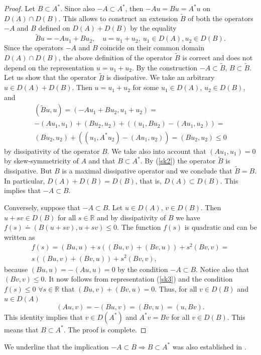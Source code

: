 \documentclass[12pt]{article}
\newcommand{\R}{{\mathbb R}}
\numberwithin{equation}{section}
\theoremstyle{plain}
\theoremstyle{definition}
\begin{document}
\begin{proof}
Let $B\subset A^*$. Since also $-A\subset A^*$, then $-Au=Bu=A^*u$ on $D(A)\cap D(B)$. This allows to construct an extension  $\tilde B$
of both the operators $-A$ and $B$ defined on $D(A)+D(B)$ by the equality
\[
\tilde Bu=-Au_1+Bu_2, \quad u=u_1+u_2, \ u_1\in D(A), u_2\in D(B).
\]
Since the operators $-A$ and $B$ coincide on their common domain $D(A)\cap D(B)$, the above definition of the operator $\tilde B$ is correct and does not depend on the representation $u=u_1+u_2$. By the construction $-A\subset \tilde B$, $B\subset \tilde B$. Let us show that the operator $\tilde B$ is dissipative. We take an arbitrary $u\in D(A)+D(B)$. Then $u=u_1+u_2$ for some $u_1\in D(A)$, $u_2\in D(B)$, and
\begin{align}\label{sk2}
(\tilde Bu,u)=(-Au_1+Bu_2,u_1+u_2)=\nonumber\\-(Au_1,u_1)+(Bu_2,u_2)+((u_1,Bu_2)-(Au_1,u_2))=\nonumber\\
(Bu_2,u_2)+((u_1,A^*u_2)-(Au_1,u_2))=(Bu_2,u_2)\le 0
\end{align}
by dissipativity of the operator $B$. We take also into account that $(Au_1,u_1)=0$ by skew-symmetricity of $A$ and that
$B\subset A^*$. By (\ref{sk2}) the operator $\tilde B$ is dissipative. But $B$ is a maximal dissipative operator and we conclude that $\tilde B=B$. In particular, $D(A)+D(B)=D(B)$, that is, $D(A)\subset D(B)$. This implies that $-A\subset B$.

Conversely, suppose that $-A\subset B$. Let $u\in D(A)$, $v\in D(B)$. Then $u+sv\in D(B)$ for all $s\in\R$ and by dissipativity of $B$ we have $f(s)\doteq (B(u+sv),u+sv)\le 0$. The function $f(s)$ is quadratic and can be written as
\begin{align}\label{sk3}
f(s)=(Bu,u)+s((Bu,v)+(Bv,u))+s^2(Bv,v)=\nonumber\\ s((Bu,v)+(Bv,u))+s^2(Bv,v),
\end{align}
because  $(Bu,u)=-(Au,u)=0$ by the condition $-A\subset B$. Notice also that $(Bv,v)\le 0$. It now follows from representation
(\ref{sk3}) and the condition $f(s)\le 0$ $\forall s\in\R$ that $(Bu,v)+(Bv,u)=0$. Thus, for all $v\in D(B)$ and $u\in D(A)$ \[(Au,v)=-(Bu,v)=(Bv,u)=(u,Bv).\]
This identity implies that $v\in D(A^*)$ and $A^*v=Bv$ for all $v\in D(B)$. This means that $B\subset A^*$. The proof is complete.
\end{proof}
We underline that the implication $-A\subset B \Rightarrow B\subset A^*$ was also established in \cite[Lemma~1.1.5]{Phil}.
\end{document}
